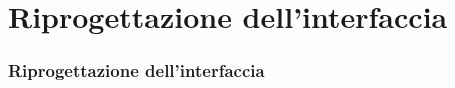 \documentclass[../../../main.tex]{subfiles}
\begin{document}
\section{Riprogettazione dell'interfaccia}

\begin{frame}
    \frametitle{Riprogettazione dell'interfaccia}
\end{frame}
    







\end{document}

